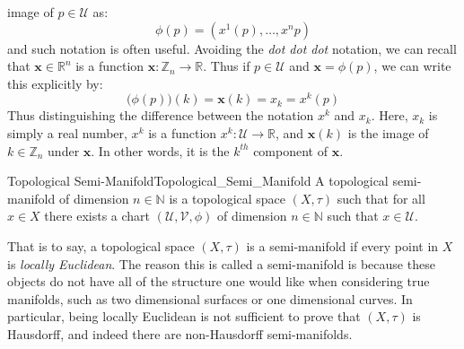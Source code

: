    image of $p\in\mathcal{U}$ as:
    \begin{equation}
        \phi(p)=(x^{1}(p),\dots,x^{n}{p})
    \end{equation}
    and such notation is often useful. Avoiding the \textit{dot dot dot}
    notation, we can recall that $\mathbf{x}\in\mathbb{R}^{n}$ is a function
    $\mathbf{x}:\mathbb{Z}_{n}\rightarrow\mathbb{R}$. Thus if $p\in\mathcal{U}$
    and $\mathbf{x}=\phi(p)$, we can write this explicitly by:
    \begin{equation}
        \big(\phi(p)\big)(k)=\mathbf{x}(k)=x_{k}=x^{k}(p)
    \end{equation}
    Thus distinguishing the difference between the notation $x^{k}$ and $x_{k}$.
    Here, $x_{k}$ is simply a real number, $x^{k}$ is a function
    $x^{k}:\mathcal{U}\rightarrow\mathbb{R}$, and $\mathbf{x}(k)$ is the image
    of $k\in\mathbb{Z}_{n}$ under $\mathbf{x}$. In other words, it is the
    $k^{th}$ component of $\mathbf{x}$.
    \begin{fdefinition}{Topological Semi-Manifold}{Topological_Semi_Manifold}
        A topological semi-manifold of dimension $n\in\mathbb{N}$ is a
        topological space $(X,\tau)$ such that for all $x\in{X}$ there exists a
        chart $(\mathcal{U},\mathcal{V},\phi)$ of dimension $n\in\mathbb{N}$
        such that $x\in\mathcal{U}$.
    \end{fdefinition}
    That is to say, a topological space $(X,\tau)$ is a semi-manifold if every
    point in $X$ is \textit{locally Euclidean}. The reason this is called a
    semi-manifold is because these objects do not have all of the structure one
    would like when considering true manifolds, such as two dimensional surfaces
    or one dimensional curves. In particular, being locally Euclidean is not
    sufficient to prove that $(X,\tau)$ is Hausdorff, and indeed there are
    non-Hausdorff semi-manifolds.
